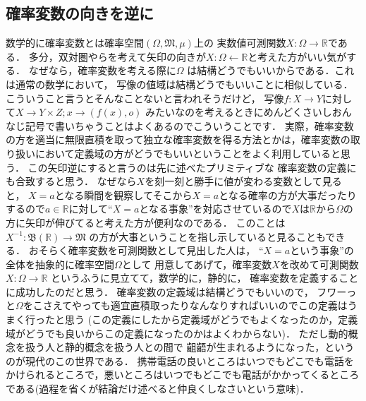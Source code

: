\documentclass[leqno, 12pt]{jsarticle}
\newcommand{\rr}{\mathbb{R}}
\begin{document}
\subsection{確率変数の向きを逆に}
数学的に確率変数とは確率空間$(\Omega, \mathfrak{M}, \mu)$上の
実数値可測関数$X\colon \Omega \to \rr$である．
多分，双対圏やらを考えて矢印の向きが$X\colon \Omega\gets \rr$と考えた方がいい気がする．
なぜなら，確率変数を考える際に$\Omega$
は結構どうでもいいからである．これは通常の数学において，
写像の値域は結構どうでもいいことに相似している．
こういうこと言うとそんなことないと言われそうだけど，
写像$f\colon X\to Y$に対して$X\to Y\times Z; x\to (f(x), o)$
みたいなのを考えるときにめんどくさいしおんなじ記号で書いちゃうことはよくあるのでこういうことです．
実際，確率変数の方を適当に無限直積を取って独立な確率変数を得る方法とかは，確率変数の取り扱いにおいて定義域の方がどうでもいいということをよく利用していると思う．
この矢印逆にすると言うのは先に述べたプリミティブな
確率変数の定義にも合致すると思う．
なぜなら$X$を刻一刻と勝手に値が変わる変数として見ると，
$X=a$となる瞬間を観察してそこから$X=a$となる確率の方が大事だったりするので$a\in \rr$に対して``$X=a$となる事象''を対応させているので$X$は$\rr$から$\Omega$の方に矢印が伸びてると考えた方が便利なのである．
このことは
$X^{-1}\colon \mathfrak{B}(\rr)\to \mathfrak{M}$
の方が大事ということを指し示していると見ることもできる．
おそらく確率変数を可測関数として見出した人は，
``$X=a$という事象''の全体を抽象的に確率空間$\Omega$として
用意してあげて，確率変数$X$を改めて可測関数
$X\colon \Omega\to \rr$
というふうに見立てて，数学的に，静的に，
確率変数を定義することに成功したのだと思う．
確率変数の定義域は結構どうでもいいので，
フワーっと$\Omega$をこさえてやっても適宜直積取ったりなんなりすればいいのでこの定義はうまく行ったと思う
(この定義にしたから定義域がどうでもよくなったのか，定義域がどうでも良いからこの定義になったのかはよくわからない)．
ただし動的概念を扱う人と静的概念を扱う人との間で
齟齬が生まれるようになった，というのが現代のこの世界である．
携帯電話の良いところはいつでもどこでも電話をかけられるところで，悪いところはいつでもどこでも電話がかかってくるところである(過程を省くが結論だけ述べると仲良くしなさいという意味)．

	
	
\end{document}
